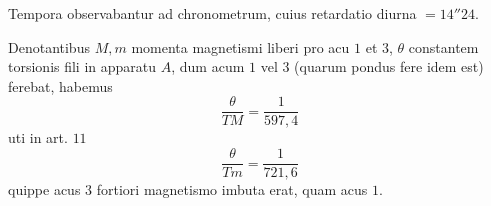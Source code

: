 Tempora observabantur ad chronometrum, cuius retardatio diurna $=14''24$.

Denotantibus $M,m$ momenta magnetismi liberi pro acu $1$ et $3$, $\theta$ constantem torsionis fili in apparatu $A$, dum acum $1$ vel $3$ (quarum pondus fere idem est) ferebat, habemus
\[
\frac{\theta}{TM}=\frac1{597{,}4}
\]
uti in art. $11$
\[
\frac{\theta}{Tm}=\frac1{721{,}6}
\]
quippe acus $3$ fortiori magnetismo imbuta erat, quam acus $1$.
